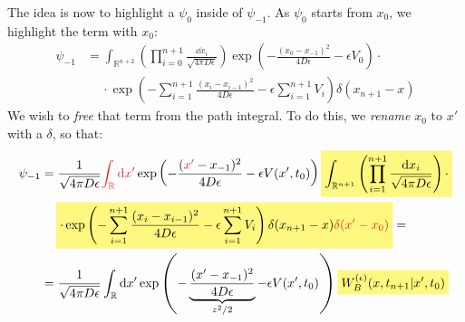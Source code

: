 \documentclass[../template.tex]{subfiles}
\begin{document}
\begin{exo}
\begin{enumerate}
        The idea is now to highlight a $\psi_0$ inside of $\psi_{-1}$. As $\psi_0$ starts from $x_0$, we highlight the term with $x_0$:
        \begin{align*}
            \psi_{-1} &= \int_{\mathbb{R}^{n+2}} \left(\prod_{i=0}^{n+1}\frac{\dd{x_i}}{\sqrt{4 \pi D \epsilon}} \right) \exp\left(-\frac{(x_0-x_{-1})^2}{4 D \epsilon} - \epsilon V_0\right) \cdot\\
            &\quad \> \cdot  \exp\left(-\sum_{i=1}^{n+1} \frac{(x_i - x_{i-1})^2}{4D \epsilon}  - \epsilon \sum_{i=1}^{n+1} V_i\right) \delta(x_{n+1}-x)
        \end{align*}
        We wish to \textit{free} that term from the path integral. To do this, we \textit{rename} $x_0$ to $x'$ with a $\delta$, so that:
        \begin{align*}
            \psi_{-1} &= \frac{1}{\sqrt{4 \pi D \epsilon}} \textcolor{Red}{\int_{\mathbb{R}}\dd{x'}} \exp\left(-\frac{(\textcolor{Red}{x'}-x_{-1})^2}{4 D \epsilon}  - \epsilon V(x',t_0)\right)   \hlc{Yellow}{\int_{\mathbb{R}^{n+1}}\left(\prod_{i=1}^{n+1} \frac{\dd{x_i}}{\sqrt{4 \pi D \epsilon}} \right)\cdot}\\
            &\quad\> \hlc{Yellow}{\cdot\exp\left(-\sum_{i=1}^{n+1} \frac{(x_i - x_{i-1})^2}{4D \epsilon}  - \epsilon \sum_{i=1}^{n+1} V_i\right) \delta(x_{n+1}-x) \textcolor{Red}{\delta(x'-x_0)}} =\\
            &= \frac{1}{\sqrt{4 \pi D \epsilon}} \int_{\mathbb{R}} \dd{x'} \exp\left(-\underbrace{\frac{(x'-x_{-1})^2}{4 D \epsilon}}_{z^{2}/2} - \epsilon V(x',t_0)\right) \hlc{Yellow}{W_B^{(\epsilon)}(x,t_{n+1}|x',t_0)}
        \end{align*}  


\end{enumerate}
\end{exo}
\end{document}
